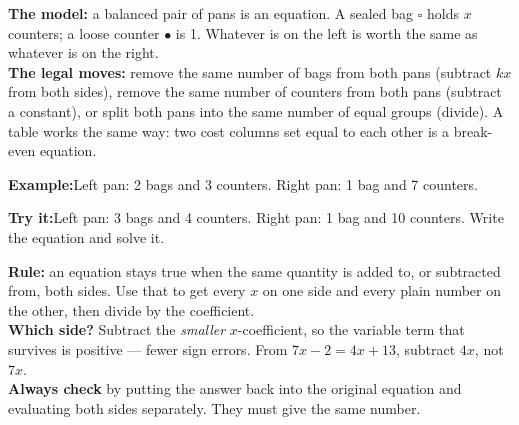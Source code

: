\documentclass[12pt]{article}
\begin{document}


\begin{formulabox}
\textbf{The model:} a balanced pair of pans is an equation. A sealed bag
$\square$ holds $x$ counters; a loose counter $\bullet$ is 1. Whatever is on the
left is worth the same as whatever is on the right.\\[3pt]
\textbf{The legal moves:} remove the same number of bags from both pans
(subtract $kx$ from both sides), remove the same number of counters from both
pans (subtract a constant), or split both pans into the same number of equal
groups (divide). A table works the same way: two cost columns set equal to each
other is a break-even equation.
\end{formulabox}

\begin{examplebox}
\textbf{Example:}\quad Left pan: 2 bags and 3 counters. Right pan: 1 bag and 7 counters.
\end{examplebox}

\begin{tryitbox}
\textbf{Try it:}\quad Left pan: 3 bags and 4 counters. Right pan: 1 bag and 10
counters. Write the equation and solve it.\\[2pt]
\end{tryitbox}


\begin{formulabox}
\textbf{Rule:} an equation stays true when the same quantity is added to, or
subtracted from, both sides. Use that to get every $x$ on one side and every plain
number on the other, then divide by the coefficient.\\[3pt]
\textbf{Which side?} Subtract the \emph{smaller} $x$-coefficient, so the variable
term that survives is positive --- fewer sign errors. From $7x - 2 = 4x + 13$,
subtract $4x$, not $7x$.\\[3pt]
\textbf{Always check} by putting the answer back into the original equation and
evaluating both sides separately. They must give the same number.
\end{formulabox}
\end{document}
